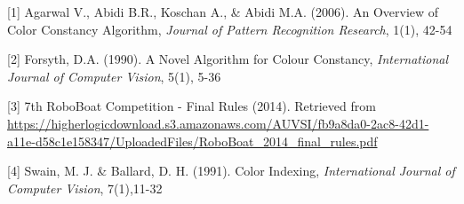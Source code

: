 \documentclass{article} %
\begin{document}
\small{
[1]  Agarwal V., Abidi B.R., Koschan A., \& Abidi M.A. (2006). An Overview of Color Constancy Algorithm, {\it Journal of Pattern Recognition Research}, 1(1), 42-54

[2] Forsyth, D.A. (1990). A Novel Algorithm for Colour Constancy, {\it International Journal of Computer Vision}, 5(1), 5-36

[3]  7th RoboBoat Competition - Final Rules (2014). Retrieved from
\url{https://higherlogicdownload.s3.amazonaws.com/AUVSI/fb9a8da0-2ac8-42d1-a11e-d58c1e158347/UploadedFiles/RoboBoat_2014_final_rules.pdf}

[4] Swain, M. J. \& Ballard, D. H. (1991). Color Indexing, {\it International Journal of Computer Vision}, 7(1),11-32



}
\end{document}
